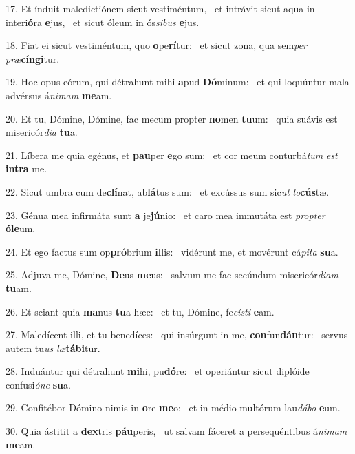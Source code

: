 17. Et índuit maledictiónem sicut vestiméntum, \dag\  et intrávit sicut aqua in interi\textbf{ó}ra \textbf{e}jus, \ast\  et sicut óleum in ós\textit{si}\textit{bus} \textbf{e}jus.\

18. Fiat ei sicut vestiméntum, quo \textbf{o}pe\textbf{rí}tur: \ast\  et sicut zona, qua sem\textit{per} \textit{præ}\textbf{cín}\textbf{gi}tur.\

19. Hoc opus eórum, qui détrahunt mihi \textbf{a}pud \textbf{Dó}minum: \ast\  et qui loquúntur mala advérsus á\textit{ni}\textit{mam} \textbf{me}am.\

20. Et tu, Dómine, Dómine, fac mecum propter \textbf{no}men \textbf{tu}um: \ast\  quia suávis est misericór\textit{di}\textit{a} \textbf{tu}a.\

21. Líbera me quia egénus, et \textbf{pau}per \textbf{e}go sum: \ast\  et cor meum conturbá\textit{tum} \textit{est} \textbf{in}\textbf{tra} me.\

22. Sicut umbra cum de\textbf{clí}nat, ab\textbf{lá}tus sum: \ast\  et excússus sum sic\textit{ut} \textit{lo}\textbf{cús}tæ.\

23. Génua mea infirmáta sunt \textbf{a} je\textbf{jú}nio: \ast\  et caro mea immutáta est \textit{prop}\textit{ter} \textbf{ó}\textbf{le}um.\

24. Et ego factus sum op\textbf{pró}brium \textbf{il}lis: \ast\  vidérunt me, et movérunt cá\textit{pi}\textit{ta} \textbf{su}a.\

25. Adjuva me, Dómine, \textbf{De}us \textbf{me}us: \ast\  salvum me fac secúndum misericór\textit{di}\textit{am} \textbf{tu}am.\

26. Et sciant quia \textbf{ma}nus \textbf{tu}a hæc: \ast\  et tu, Dómine, fe\textit{cís}\textit{ti} \textbf{e}am.\

27. Maledícent illi, et tu benedíces: \dag\  qui insúrgunt in me, \textbf{con}fun\textbf{dán}tur: \ast\  servus autem tu\textit{us} \textit{læ}\textbf{tá}\textbf{bi}tur.\

28. Induántur qui détrahunt \textbf{mi}hi, pu\textbf{dó}re: \ast\  et operiántur sicut diplóide confusi\textit{ó}\textit{ne} \textbf{su}a.\

29. Confitébor Dómino nimis in \textbf{o}re \textbf{me}o: \ast\  et in médio multórum lau\textit{dá}\textit{bo} \textbf{e}um.\

30. Quia ástitit a \textbf{dex}tris \textbf{páu}peris, \ast\  ut salvam fáceret a persequéntibus á\textit{ni}\textit{mam} \textbf{me}am.\

